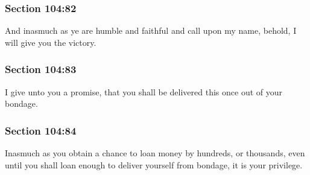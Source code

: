 	\subsubsection{Section 104:82} %
		\label{DC104-82}

		And inasmuch as ye are humble and faithful and call upon my name, behold, I will give you the victory.


	\subsubsection{Section 104:83} %
		\label{DC104-83}

		I give unto you a promise, that you shall be delivered this once out of your bondage.


	\subsubsection{Section 104:84} %
		\label{DC104-84}

		Inasmuch as you obtain a chance to loan money by hundreds, or thousands, even until you shall loan enough to deliver yourself from bondage, it is your privilege.


